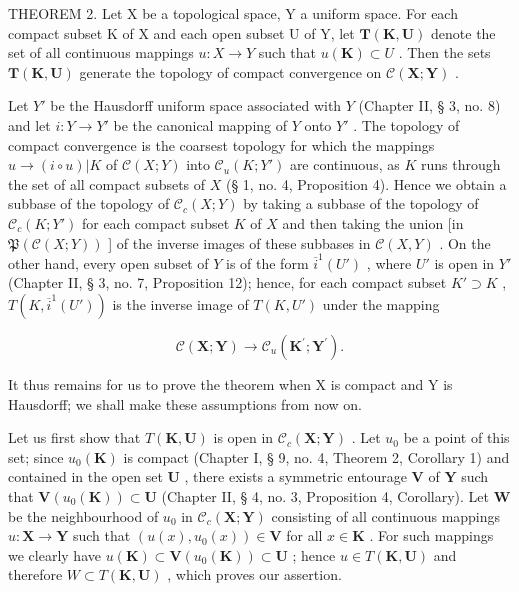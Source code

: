 THEOREM 2. Let X be a topological space, Y a uniform space. For each compact subset K of X and each open subset U of Y, let \(\mathbf{T}(\mathbf{K},\mathbf{U})\) denote the set of all continuous mappings \(u:X\to Y\) such that \(u(\mathbf{K})\subset U\) . Then the sets \(\mathbf{T}(\mathbf{K},\mathbf{U})\) generate the topology of compact convergence on \(\mathcal{C}(\mathbf{X};\mathbf{Y})\) .

Let \(Y'\) be the Hausdorff uniform space associated with \(Y\) (Chapter II, § 3, no. 8) and let \(i: Y \to Y'\) be the canonical mapping of \(Y\) onto \(Y'\) . The topology of compact convergence is the coarsest topology for which the mappings \(u \to (i \circ u)|K\) of \(\mathcal{C}(X; Y)\) into \(\mathcal{C}_u(K; Y')\) are continuous, as \(K\) runs through the set of all compact subsets of \(X\) (§ 1, no. 4, Proposition 4). Hence we obtain a subbase of the topology of \(\mathcal{C}_c(X; Y)\) by taking a subbase of the topology of \(\mathcal{C}_c(K; Y')\) for each compact subset \(K\) of \(X\) and then taking the union {[}in \(\mathfrak{P}(\mathcal{C}(X; Y))\) {]} of the inverse images of these subbases in \(\mathcal{C}(X, Y)\) . On the other hand, every open subset of \(Y\) is of the form \(\overline{i}^1(U')\) , where \(U'\) is open in \(Y'\) (Chapter II, § 3, no. 7, Proposition 12); hence, for each compact subset \(K' \supset K\) , \(T(K, \overline{i}^1(U'))\) is the inverse image of \(T(K, U')\) under the mapping

\[
\mathcal {C} (\mathbf {X}; \mathbf {Y}) \rightarrow \mathcal {C} _ {u} (\mathbf {K} ^ {\prime}; \mathbf {Y} ^ {\prime}).
\]

It thus remains for us to prove the theorem when X is compact and Y is Hausdorff; we shall make these assumptions from now on.

Let us first show that \(T(\mathbf{K}, \mathbf{U})\) is open in \(\mathcal{C}_c(\mathbf{X}; \mathbf{Y})\) . Let \(u_0\) be a point of this set; since \(u_0(\mathbf{K})\) is compact (Chapter I, § 9, no. 4, Theorem 2, Corollary 1) and contained in the open set \(\mathbf{U}\) , there exists a symmetric entourage \(\mathbf{V}\) of \(\mathbf{Y}\) such that \(\mathbf{V}(u_0(\mathbf{K})) \subset \mathbf{U}\) (Chapter II, § 4, no. 3, Proposition 4, Corollary). Let \(\mathbf{W}\) be the neighbourhood of \(u_0\) in \(\mathcal{C}_c(\mathbf{X}; \mathbf{Y})\) consisting of all continuous mappings \(u: \mathbf{X} \to \mathbf{Y}\) such that \((u(x), u_0(x)) \in \mathbf{V}\) for all \(x \in \mathbf{K}\) . For such mappings we clearly have \(u(\mathbf{K}) \subset \mathbf{V}(u_0(\mathbf{K})) \subset \mathbf{U}\) ; hence \(u \in T(\mathbf{K}, \mathbf{U})\) and therefore \(W \subset T(\mathbf{K}, \mathbf{U})\) , which proves our assertion.

